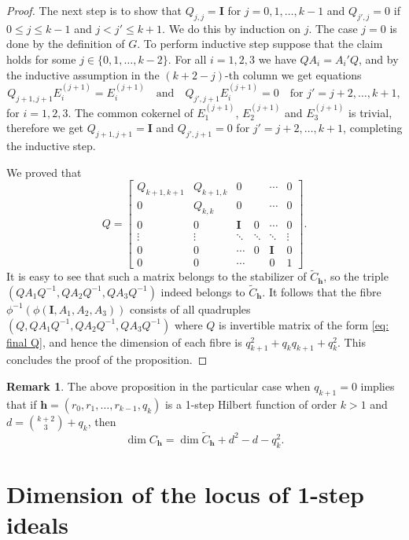 \documentclass[11pt]{amsart}
\theoremstyle{definition}
\newtheorem{rmk}[thm]{Remark}
\newcommand{\h}{\mathbf{h}}
\newcommand{\tC}{\widetilde{C}}
\newcommand{\II}{\mathbf{I}}
\begin{document}
\begin{proof}
The next step is to show that $Q_{j,j}=\II$ for $j=0,1,\ldots ,k-1$ and $Q_{j',j}=0$ if $0\le j\le k-1$ and $j<j'\le k+1$. We do this by induction on $j$. The case $j=0$ is done by the definition of $G$. To perform inductive step suppose that the claim holds for some $j\in\{0,1,\ldots ,k-2\}$. For all $i=1,2,3$ we have $QA_i=A_i'Q$, and by the inductive assumption in the $(k+2-j)$-th column we get equations
$$Q_{j+1,j+1}E_i^{(j+1)}=E_i^{(j+1)}\quad \mathrm{and}\quad Q_{j',j+1}E_i^{(j+1)}=0\quad \mathrm{for}\, \, j'=j+2,\ldots ,k+1,$$
for $i=1,2,3$. The common cokernel of $E_1^{(j+1)}$, $E_2^{(j+1)}$ and $E_3^{(j+1)}$ is trivial, therefore we get $Q_{j+1,j+1}=\II$ and $Q_{j',j+1}=0$ for $j'=j+2,\ldots ,k+1$, completing the inductive step.

We proved that
\begin{equation}\label{eq: final Q}
Q=\begin{bmatrix}
Q_{k+1,k+1} & Q_{k+1,k} & 0 & & \cdots & 0\\
0 & Q_{k,k} & 0 & & \cdots & 0\\
0 & 0 & \II & 0 & \cdots & 0\\
\vdots & \vdots & \ddots & \ddots & \ddots & \vdots \\
0 & 0 & \cdots & 0 & \II & 0\\
0 & 0 & \cdots & & 0 & 1
\end{bmatrix}.
\end{equation}
It is easy to see that such a matrix belongs to the stabilizer of $\tC_\h$, so the triple $(QA_1Q^{-1},QA_2Q^{-1},QA_3Q^{-1})$ indeed belongs to $\tC_\h$. It follows that the fibre $\phi^{-1}(\phi(\II,A_1,A_2,A_3))$ consists of all quadruples $(Q,QA_1Q^{-1},QA_2Q^{-1},QA_3Q^{-1})$ where $Q$ is invertible matrix of the form \eqref{eq: final Q}, and hence the dimension of each fibre is $q_{k+1}^2+q_kq_{k+1}+q_k^2$. This concludes the proof of the proposition.
\end{proof}

\begin{rmk}\label{rmk: dim of stabilizer 1-step}
The above proposition in the particular case when $q_{k+1}=0$ implies that if $\h=(r_0,r_1,\ldots ,r_{k-1},q_k)$ is a 1-step Hilbert function of order $k>1$ and $d={k+2\choose 3}+q_k$, then
$$\dim C_\h=\dim \tC_\h+d^2-d-q_k^2.$$
\end{rmk}


\section{Dimension of the locus of 1-step ideals}
\end{document}

